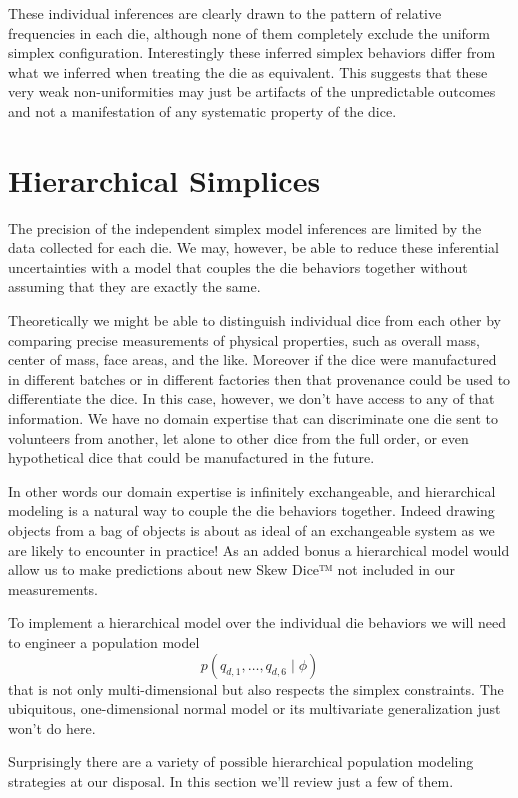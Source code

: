 \documentclass[
  letterpaper,
  DIV=11,
  numbers=noendperiod]{scrartcl}
\begin{document}
These individual inferences are clearly drawn to the pattern of relative
frequencies in each die, although none of them completely exclude the
uniform simplex configuration. Interestingly these inferred simplex
behaviors differ from what we inferred when treating the die as
equivalent. This suggests that these very weak non-uniformities may just
be artifacts of the unpredictable outcomes and not a manifestation of
any systematic property of the dice.

\section{Hierarchical Simplices}\label{hierarchical-simplices}

The precision of the independent simplex model inferences are limited by
the data collected for each die. We may, however, be able to reduce
these inferential uncertainties with a model that couples the die
behaviors together without assuming that they are exactly the same.

Theoretically we might be able to distinguish individual dice from each
other by comparing precise measurements of physical properties, such as
overall mass, center of mass, face areas, and the like. Moreover if the
dice were manufactured in different batches or in different factories
then that provenance could be used to differentiate the dice. In this
case, however, we don't have access to any of that information. We have
no domain expertise that can discriminate one die sent to volunteers
from another, let alone to other dice from the full order, or even
hypothetical dice that could be manufactured in the future.

In other words our domain expertise is infinitely exchangeable, and
hierarchical modeling is a natural way to couple the die behaviors
together. Indeed drawing objects from a bag of objects is about as ideal
of an exchangeable system as we are likely to encounter in practice! As
an added bonus a hierarchical model would allow us to make predictions
about new Skew Dice™ not included in our measurements.

To implement a hierarchical model over the individual die behaviors we
will need to engineer a population model \[
p( q_{d, 1}, \ldots, q_{d, 6} \mid \phi )
\] that is not only multi-dimensional but also respects the simplex
constraints. The ubiquitous, one-dimensional normal model or its
multivariate generalization just won't do here.

Surprisingly there are a variety of possible hierarchical population
modeling strategies at our disposal. In this section we'll review just a
few of them.
\end{document}

